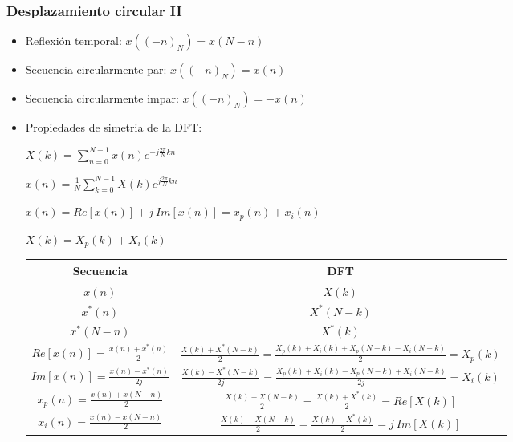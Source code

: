 
\begin{frame}
\frametitle{Desplazamiento circular II}

\footnotesize

\begin{itemize}
\item Reflexión temporal: $x((-n)_N)=x(N-n)$
\item Secuencia circularmente par: $x((-n)_N)=x(n)$  
\item Secuencia circularmente impar: $x((-n)_N)=-x(n)$   


\item Propiedades de simetria de la DFT:

\hspace{2cm}\alert{$X(k)=\sum_{n=0}^{N-1} x(n) e^{-j\frac{2\pi}{N}kn}$}

\hspace{2cm}\alert{$x(n)=\frac{1}{N}\sum_{k=0}^{N-1} X(k) e^{j\frac{2\pi}{N}kn}$}


\vspace{0.1cm}

\hspace{2cm}$x(n)=Re[x(n)]+j \: Im[x(n)]=x_p(n)+x_i(n)$

\vspace{0.1cm}

\hspace{5.3cm}$X(k)=X_p(k)+X_i(k)$

\vspace{0.1cm}

\begin{tabular}{|c|c|}

\hline
Secuencia & DFT \\ \hline
$x(n)$ & $X(k)$ \\ \hline
\alert{$x^*(n)$} & \alert{$X^*(N-k)$} \\ \hline
\alert{$x^*(N-n)$} & \alert{$X^*(k)$} \\ \hline
$Re[x(n)]=\frac{x(n)+x^*(n)}{2}$ & $\frac{X(k)+X^*(N-k)}{2}=\frac{X_p(k)+X_i(k)+X_p(N-k)-X_i(N-k)}{2}=X_p(k)$ \\ \hline
$Im[x(n)]=\frac{x(n)-x^*(n)}{2j}$ & $\frac{X(k)-X^*(N-k)}{2j}=\frac{X_p(k)+X_i(k)-X_p(N-k)+X_i(N-k)}{2j}=X_i(k)$ \\ \hline

$x_p(n)=\frac{x(n)+x(N-n)}{2}$ & $\frac{X(k)+X(N-k)}{2}=\frac{X(k)+X^*(k)}{2}=Re[X(k)]$ \\ \hline
$x_i(n)=\frac{x(n)-x(N-n)}{2}$ & $\frac{X(k)-X(N-k)}{2}=\frac{X(k)-X^*(k)}{2}=j \: Im[X(k)]$ \\ \hline

\end{tabular}


\end{itemize}

\end{frame}


